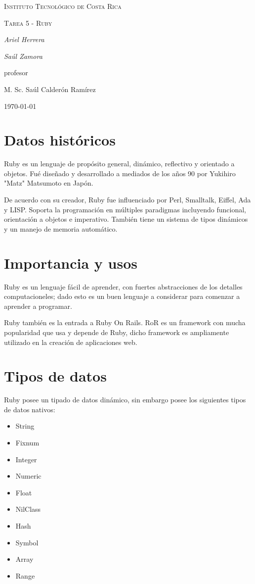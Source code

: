 \documentclass{IEEEtran}
\begin{document}
\begin{titlepage}
  \centering
  {\scshape\LARGE Instituto Tecnol\'ogico de Costa Rica \par}
  \vspace{1cm}
  {\scshape\Large Tarea 5 - Ruby\par}
  \vspace{1.5cm}
  {\Large\itshape Ariel Herrera\par}
  {\Large\itshape Sa\'ul Zamora\par}
  \vfill
  profesor\par
  M. Sc. Sa\'ul Calder\'on Ram\'irez \textsc{}

  \vfill

  {\large \today\par}
\end{titlepage}

\section{Datos hist\'oricos}
Ruby es un lenguaje de prop\'osito general, din\'amico, reflectivo y orientado a objetos. Fu\'e dise\~nado y desarrollado a mediados de los a\~nos 90 por Yukihiro "Matz" Matsumoto en Jap\'on.

De acuerdo con su creador, Ruby fue influenciado por Perl, Smalltalk, Eiffel, Ada y LISP. Soporta la programaci\'on en m\'ultiples paradigmas incluyendo funcional, orientaci\'on a objetos e imperativo. Tambi\'en tiene un sistema de tipos din\'amicos y un manejo de memoria autom\'atico.

\section{Importancia y usos}
Ruby es un lenguaje f\'acil de aprender, con fuertes abstracciones de los detalles computacioneles; dado esto es un buen lenguaje a considerar para comenzar a aprender a programar.

Ruby tambi\'en es la entrada a Ruby On Rails. RoR es un framework con mucha popularidad que usa y depende de Ruby, dicho framework es ampliamente utilizado en la creaci\'on de aplicaciones web.

\section{Tipos de datos}
Ruby posee un tipado de datos din\'amico, sin embargo posee los siguientes tipos de datos nativos:
\begin{itemize}
  \item String
  \item Fixnum
  \item Integer
  \item Numeric
  \item Float
  \item NilClass
  \item Hash
  \item Symbol
  \item Array
  \item Range
\end{itemize}
\end{document}
